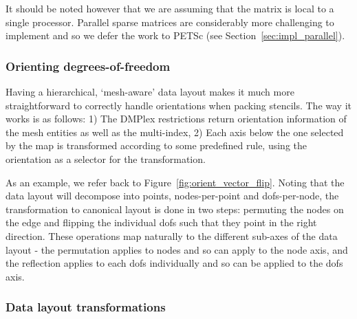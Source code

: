 It should be noted however that we are assuming that the matrix is local to a single processor.
Parallel sparse matrices are considerably more challenging to implement and so we defer the work to PETSc (see Section~\ref{sec:impl_parallel}).

\subsubsection{Orienting degrees-of-freedom}
\label{sec:impl_orientation}

Having a hierarchical, `mesh-aware' data layout makes it much more straightforward to correctly handle orientations when packing stencils.
The way it works is as follows:
1) The DMPlex restrictions return orientation information of the mesh entities as well as the multi-index,
2) Each axis below the one selected by the map is transformed according to some predefined rule, using the orientation as a selector for the transformation.

As an example, we refer back to Figure~\ref{fig:orient_vector_flip}.
Noting that the data layout will decompose into points, nodes-per-point and \glspl{dof}-per-node, the transformation to canonical layout is done in two steps: permuting the nodes on the edge and flipping the individual \glspl{dof} such that they point in the right direction.
These operations map naturally to the different sub-axes of the data layout - the permutation applies to nodes and so can apply to the node axis, and the reflection applies to each \glspl{dof} individually and so can be applied to the \glspl{dof} axis.

\subsubsection{Data layout transformations}
\label{sec:impl_datalayoutopt}


